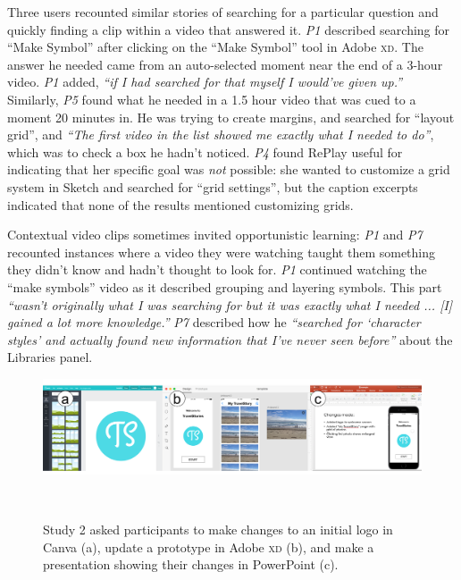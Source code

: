 Three users recounted similar stories of searching for a particular question and quickly finding a clip within a video that answered it. \textit{P1} described searching for ``Make Symbol'' after clicking on the ``Make Symbol'' tool in Adobe \textsc{xd}. The answer he needed came from an auto-selected moment near the end of a 3-hour video. \textit{P1} added, \textit{``if I had searched for that myself I would've given up.''} Similarly, \textit{P5} found what he needed in a 1.5 hour video that was cued to a moment 20 minutes in. He was trying to create margins, and searched for ``layout grid'', and \textit{``The first video in the list showed me exactly what I needed to do''}, which was to check a box he hadn't noticed. \textit{P4} found RePlay useful for indicating that her specific goal was \textit{not} possible: she wanted to customize a grid system in Sketch and searched for ``grid settings'', but the caption excerpts indicated that none of the results mentioned customizing grids.

Contextual video clips sometimes invited opportunistic learning: \textit{P1} and \textit{P7} recounted instances where a video they were watching taught them something they didn't know and hadn't thought to look for. \textit{P1} continued watching the ``make symbols'' video as it described grouping and layering symbols. This part \textit{``wasn't originally what I was searching for but it was exactly what I needed ... [I] gained a lot more knowledge.''} \textit{P7} described how he \textit{``searched for `character styles' and actually found new information that I've never seen before''} about the Libraries panel.

\begin{figure}[t!]
\centering
  \vspace{-0.2in}
\includegraphics[width=\textwidth]{replay/figures/study2_task.png}
\vspace{-0.3in}
  \caption{Study 2 asked participants to make changes to an initial logo in Canva (a), update a prototype in Adobe \textsc{xd} (b), and make a presentation showing their changes in PowerPoint (c).}~\label{fig:replay-study2-task}
  \vspace{-0.2in}

\end{figure}

